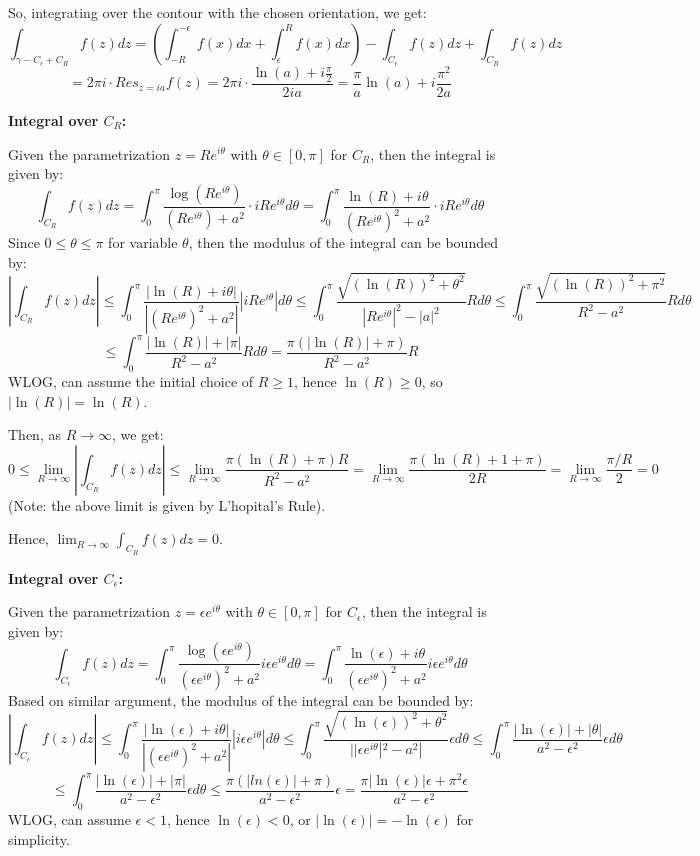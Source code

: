 \documentclass{article}
\begin{document}
So, integrating over the contour with the chosen orientation, we get:
$$\int_{\gamma - C_\epsilon + C_R}f(z)dz = \left(\int_{-R}^{-\epsilon}f(x)dx+\int_{\epsilon}^{R}f(x)dx\right) - \int_{C_\epsilon}f(z)dz + \int_{C_R}f(z)dz$$
$$ = 2\pi i\cdot Res_{z=ia}f(z) = 2\pi i\cdot \frac{\ln(a)+i\frac{\pi}{2}}{2ia} = \frac{\pi}{a}\ln(a)+i\frac{\pi^2}{2a}$$

\hfil

\textbf{Integral over $C_R$:}

Given the parametrization $z=Re^{i\theta}$ with $\theta\in [0,\pi]$ for $C_R$, then the integral is given by:
$$\int_{C_R}f(z)dz = \int_{0}^{\pi}\frac{\log(Re^{i\theta})}{(Re^{i\theta})+a^2}\cdot iRe^{i\theta}d\theta = \int_{0}^{\pi}\frac{\ln(R) + i\theta}{(Re^{i\theta})^2+a^2}\cdot iRe^{i\theta}d\theta$$
Since $0\leq \theta \leq \pi$ for variable $\theta$, then the modulus of the integral can be bounded by:
$$\left|\int_{C_R}f(z)dz\right|\leq \int_{0}^{\pi}\frac{|\ln(R) + i\theta|}{|(Re^{i\theta})^2+a^2|}|iRe^{i\theta}|d\theta \leq \int_{0}^{\pi}\frac{\sqrt{(\ln(R))^2+\theta^2}}{|Re^{i\theta}|^2-|a|^2}Rd\theta \leq \int_{0}^{\pi}\frac{\sqrt{(\ln(R))^2+\pi^2}}{R^2-a^2}Rd\theta$$
$$\leq \int_{0}^{\pi}\frac{|\ln(R)|+|\pi|}{R^2-a^2}Rd\theta = \frac{\pi(|\ln(R)|+\pi)}{R^2-a^2}R$$
WLOG, can assume the initial choice of $R\geq 1$, hence $\ln(R)\geq 0$, so $|\ln(R)|=\ln(R)$.

Then, as $R\rightarrow\infty$, we get:
$$0\leq \lim_{R\rightarrow\infty}\left|\int_{C_R}f(z)dz\right| \leq \lim_{R\rightarrow\infty}\frac{\pi(\ln(R)+\pi)R}{R^2-a^2} = \lim_{R\rightarrow\infty}\frac{\pi(\ln(R)+1+\pi)}{2R} = \lim_{R\rightarrow\infty}\frac{\pi/R}{2} = 0$$
(Note: the above limit is given by L'hopital's Rule).

Hence, $\lim_{R\rightarrow\infty}\int_{C_R}f(z)dz = 0$.

\hfil

\textbf{Integral over $C_\epsilon$:}

Given the parametrization $z=\epsilon e^{i\theta}$ with $\theta\in [0,\pi]$ for $C_\epsilon$, then the integral is given by:
$$\int_{C_\epsilon}f(z)dz = \int_{0}^{\pi}\frac{\log(\epsilon e^{i\theta})}{(\epsilon e^{i\theta})^2+a^2}i\epsilon e^{i\theta}d\theta=\int_{0}^{\pi}\frac{\ln(\epsilon)+i\theta}{(\epsilon e^{i\theta})^2+a^2}i\epsilon e^{i\theta}d\theta$$
Based on similar argument, the modulus of the integral can be bounded by:
$$\left|\int_{C_\epsilon}f(z)dz\right|\leq \int_{0}^{\pi}\frac{|\ln(\epsilon)+i\theta|}{|(\epsilon e^{i\theta})^2+a^2|}|i\epsilon e^{i\theta}|d\theta \leq \int_{0}^{\pi}\frac{\sqrt{(\ln(\epsilon))^2+\theta^2}}{||\epsilon e^{i\theta}|^2-a^2|}\epsilon d\theta \leq \int_{0}^{\pi}\frac{|\ln(\epsilon)|+|\theta|}{a^2-\epsilon^2}\epsilon d\theta$$
$$\leq \int_{0}^{\pi}\frac{|\ln(\epsilon)|+|\pi|}{a^2-\epsilon^2}\epsilon d\theta\leq \frac{\pi(|ln(\epsilon)|+\pi)}{a^2-\epsilon^2}\epsilon = \frac{\pi|\ln(\epsilon)|\epsilon +\pi^2\epsilon}{a^2-\epsilon^2}$$
WLOG, can assume $\epsilon<1$, hence $\ln(\epsilon)<0$, or $|\ln(\epsilon)|=-\ln(\epsilon)$ for simplicity.
\end{document}
